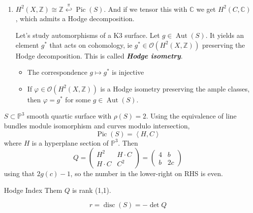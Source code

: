 \begin{enumerate}
	\item $H^{2}(X,\mathbb{Z})\cong \mathbb{Z} \overset{\pi}{\hookleftarrow}\operatorname{Pic}(S) $. And if we tensor this with $\mathbb{C}$ we get $H^{2}(C,\mathbb{C})$, which admits a Hodge decomposition.

		Let's study automorphisms of a K3 surface. Let $g\in\operatorname{Aut}(S)$. It yields an element $g^*$ that acts on cohomology, ie $g^*\in\mathcal{O}(H^{2}(X,\mathbb{Z}))$ preserving the Hodge decomposition. This is called \textit{\textbf{Hodge isometry}}.

\begin{thm}\leavevmode
	\begin{itemize}
	\item The correspondence $g\mapsto g^*$ is injective 
	
	\item If $\varphi\in\mathcal{O}(H^{2}(X,\mathbb{Z}))$ is a Hodge isometry preserving the ample classes, then $\varphi=g^*$ for some $g\in\operatorname{Aut}(S)$.
	\end{itemize}
\end{thm}
\end{enumerate}

\begin{example}
	$S\subset \mathbb{P}^3$ smooth quartic surface with $\rho(S)=2$. Using the equivalence of line bundles module isomorphism and curves modulo intersection,
	\[\operatorname{Pic}(S)= \left<H,C\right> \]
	where $H$ is a hyperplane section of $\mathbb{P}^3$. Then
	\[Q=\begin{pmatrix} H^2& H\cdot C\\H\cdot C& C^2 \end{pmatrix} =\begin{pmatrix} 4&b\\b&2c \end{pmatrix} \]
	using that $2g(c)-1$, so the number in the lower-right on RHS is even.
\end{example}

\begin{remark}
	Hodge Index Them $Q$ is rank (1,1).
\end{remark}

\begin{defn}[Discriminant]
	\[r=\operatorname{disc}(S)=-\det Q\]
\end{defn}


